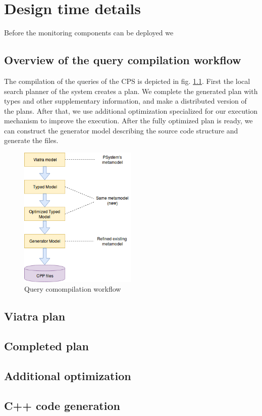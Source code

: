 \chapter{Design time details}



Before the monitoring components can be deployed we 



\section{Overview of the query compilation workflow}

The compilation of the queries of the CPS is depicted in fig. \ref{figure:query-compile-workflow}. First the local search planner of the \viatra{} system creates a plan. We complete the generated plan with types and other supplementary information, and make a distributed version of the plans. After that, we use additional optimization specialized for our execution mechanism to improve the execution. After the fully optimized plan is ready, we can construct the generator model describing the source code structure and generate the \cpp{} files.

\begin{figure}[h]
	\begin{center}
		\includegraphics[width=0.5\textwidth]{figures/workflow.png}
		\caption{Query comompilation workflow}
		\label{figure:query-compile-workflow}
	\end{center}
\end{figure}


\section{Viatra plan}


\section{Completed plan}


\section{Additional optimization}


\section{C++ code generation}


